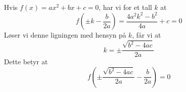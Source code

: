  \\
Hvis $ f(x)=ax^2+bx+c=0 $, har vi for et tall $ k $ at
\[ f\left(\pm k-\frac{b}{2a}\right)=\frac{4a^2k^2-b^2}{4a}+c=0 \]
Løser vi denne ligningen med hensyn på $ k $, får vi at
\[ k=\pm \frac{\sqrt{b^2-4ac}}{2a} \]
Dette betyr at
\[ f\left(\pm \frac{\sqrt{b^2-4ac}}{2a}-\frac{b}{2a}\right)=0 \]
